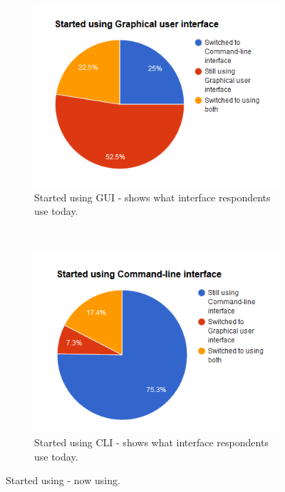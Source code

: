 \documentclass[a4paper,oneside]{bth} %
\begin{document}
				\begin{figure}[H]
					\centering
					\begin{subfigure}[b]{0.45\textwidth}
						\includegraphics[width=\textwidth]{graphs/started-using-gui.png}
						\caption{Started using GUI - shows what interface respondents use today.}
						\label{fig:started-gui}
					\end{subfigure}
					~
					\begin{subfigure}[b]{0.45\textwidth}
						\includegraphics[width=\textwidth]{graphs/started-using-cli.png}
						\caption{Started using CLI - shows what interface respondents use today.}
						\label{fig:started-cli}
					\end{subfigure}
					\caption{Started using - now using.}\label{fig:q9-q10}
				\end{figure}
				
\end{document}
